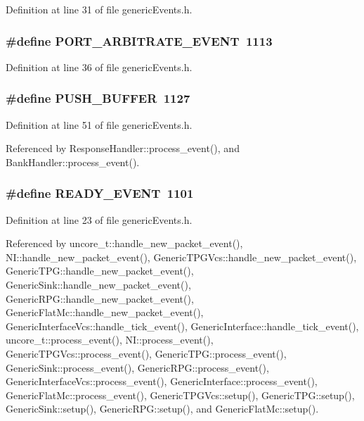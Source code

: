 Definition at line 31 of file genericEvents.h.
\subsubsection[{PORT\_\-ARBITRATE\_\-EVENT}]{\setlength{\rightskip}{0pt plus 5cm}\#define PORT\_\-ARBITRATE\_\-EVENT~1113}\label{genericEvents_8h_164dc31486b5f3c19d00e5a227a7a79d}




Definition at line 36 of file genericEvents.h.
\subsubsection[{PUSH\_\-BUFFER}]{\setlength{\rightskip}{0pt plus 5cm}\#define PUSH\_\-BUFFER~1127}\label{genericEvents_8h_bc24bcdf0aa7bf0d5039aab703da1cb4}




Definition at line 51 of file genericEvents.h.

Referenced by ResponseHandler::process\_\-event(), and BankHandler::process\_\-event().
\subsubsection[{READY\_\-EVENT}]{\setlength{\rightskip}{0pt plus 5cm}\#define READY\_\-EVENT~1101}\label{genericEvents_8h_3d6ad8a65b5cb883e26e192b5669767b}




Definition at line 23 of file genericEvents.h.

Referenced by uncore\_\-t::handle\_\-new\_\-packet\_\-event(), NI::handle\_\-new\_\-packet\_\-event(), GenericTPGVcs::handle\_\-new\_\-packet\_\-event(), GenericTPG::handle\_\-new\_\-packet\_\-event(), GenericSink::handle\_\-new\_\-packet\_\-event(), GenericRPG::handle\_\-new\_\-packet\_\-event(), GenericFlatMc::handle\_\-new\_\-packet\_\-event(), GenericInterfaceVcs::handle\_\-tick\_\-event(), GenericInterface::handle\_\-tick\_\-event(), uncore\_\-t::process\_\-event(), NI::process\_\-event(), GenericTPGVcs::process\_\-event(), GenericTPG::process\_\-event(), GenericSink::process\_\-event(), GenericRPG::process\_\-event(), GenericInterfaceVcs::process\_\-event(), GenericInterface::process\_\-event(), GenericFlatMc::process\_\-event(), GenericTPGVcs::setup(), GenericTPG::setup(), GenericSink::setup(), GenericRPG::setup(), and GenericFlatMc::setup().
